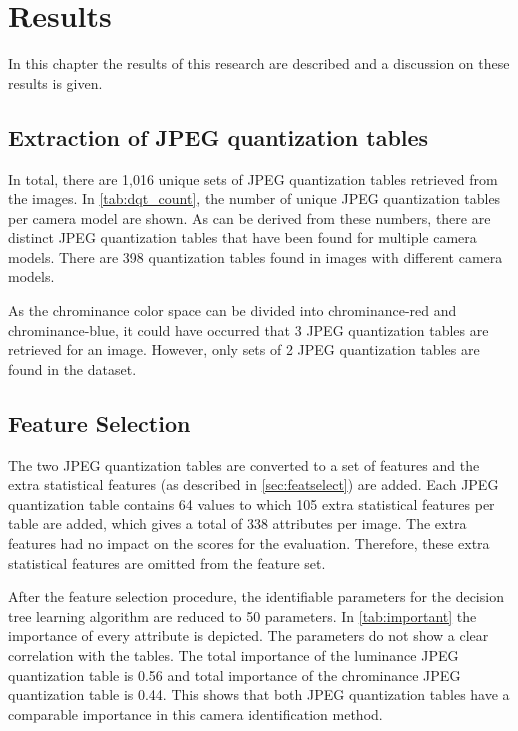 
\chapter{Results} %

\label{ch:results} %

In this chapter the results of this research are described and a discussion on these results is given. %

\section{Extraction of JPEG quantization tables}
In total, there are 1,016 unique sets of JPEG quantization tables retrieved from the images. In \autoref{tab:dqt_count}, the number of unique JPEG quantization tables per camera model are shown. As can be derived from these numbers, there are distinct JPEG quantization tables that have been found for multiple camera models. There are 398 quantization tables found in images with different camera models. 

As the chrominance color space can be divided into chrominance-red and chrominance-blue, it could have occurred that 3 JPEG quantization tables are retrieved for an image. However, only sets of 2 JPEG quantization tables are found in the dataset.

\section{Feature Selection}
The two JPEG quantization tables are converted to a set of features and the extra statistical features (as described in \autoref{sec:featselect}) are added. Each JPEG quantization table contains 64 values to which 105 extra statistical features per table are added, which gives a total of 338 attributes per image. The extra features had no impact on the scores for the evaluation. Therefore, these extra statistical features are omitted from the feature set.

After the feature selection procedure, the identifiable parameters for the decision tree learning algorithm are reduced to 50 parameters. In \autoref{tab:important} the importance of every attribute is depicted. The parameters do not show a clear correlation with the tables. The total importance of the luminance JPEG quantization table is 0.56 and total importance of the chrominance JPEG quantization table is 0.44. 
This shows that both JPEG quantization tables have a comparable importance in this camera identification method.


